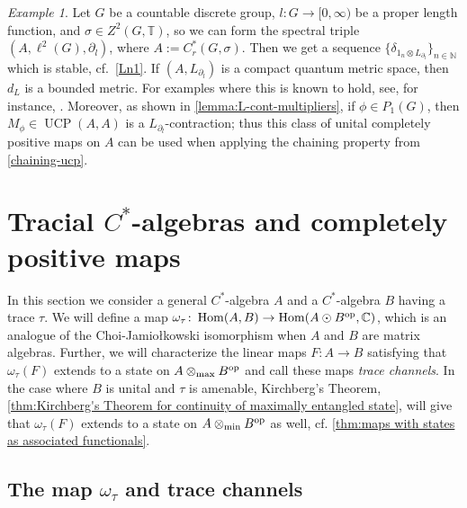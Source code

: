 \documentclass[11pt, a4paper, oneside, final, reqno]{amsart}
\newcommand{\bbN}{\mathbb{N}}
\newcommand{\bbC}{\mathbb{C}}
\newcommand{\bbT}{\mathbb{T}}
\newcommand{\Hom}{\operatorname{Hom}}
\newcommand{\UCP}{\operatorname{UCP}}
\theoremstyle{definition}
\theoremstyle{plain}
\theoremstyle{remark}
\newtheorem{example}[definition]{Example}
\numberwithin{equation}{section}
\begin{document}
\begin{example}
    Let $G$ be a countable discrete group, $l \colon G \to [0,\infty)$ be a proper length function, and $\sigma \in Z^2(G,\bbT)$, so we can form the spectral triple $(A, \ell^2(G), \partial_l)$, where $A:=C_r^*(G, \sigma)$.  Then we get a sequence $\{\delta_{1_n\otimes L_{\partial_l}}\}_{n\in \bbN}$ which is stable, cf.~\cref{Ln1}. If $(A, L_{\partial_l})$ is a compact quantum metric space, then $d_L$ is a bounded metric. For examples where this is known to hold, see, for instance, \cite{Rieffel02, OzawaRieffel, ChristRieffel, LongWu2021, Farsi-et-al}. Moreover, as shown in \cref{lemma:L-cont-multipliers}, if  $\phi \in P_1(G)$, then $M_\phi\in \UCP(A, A)$ is a $L_{\partial_l}$-contraction; thus this class of unital completely positive maps on $A$  can be used when applying the chaining property from \cref{chaining-ucp}. 
\end{example}

\section{Tracial \texorpdfstring{$C^*$}{C*}-algebras and completely positive maps}\label{sec:tracial-Cstar-algebras-and-cp-maps}

In this section we consider a general $C^*$-algebra $A$ and a $C^*$-algebra $B$ having a trace $\tau$. We will define a map $\omega_\tau \colon \Hom(A,B) \to \Hom(A \odot B^{\rm op}, \bbC)$, which is an analogue of the Choi-Jamio\l{}kowski isomorphism when $A$ and $B$ are matrix algebras. Further, we will characterize the linear maps $F \colon A \to B$ satisfying that $\omega_\tau(F)$ extends to a state on $A \otimes_{\rm max} B^{\rm op}$ and call these maps \emph{trace channels}. In the case where $B$ is unital and $\tau$ is amenable, Kirchberg's Theorem, \cref{thm:Kirchberg's Theorem for continuity of maximally entangled state}, will give that $\omega_\tau(F)$ extends to a state on $A \otimes_{\rm min} B^{\rm op}$ as well, cf. \cref{thm:maps with states as associated functionals}.

\subsection{The map \texorpdfstring{$\omega_\tau$}{omega-tau} and trace channels}\label{sec:omega-tau-and-trace-channels}
\end{document}
